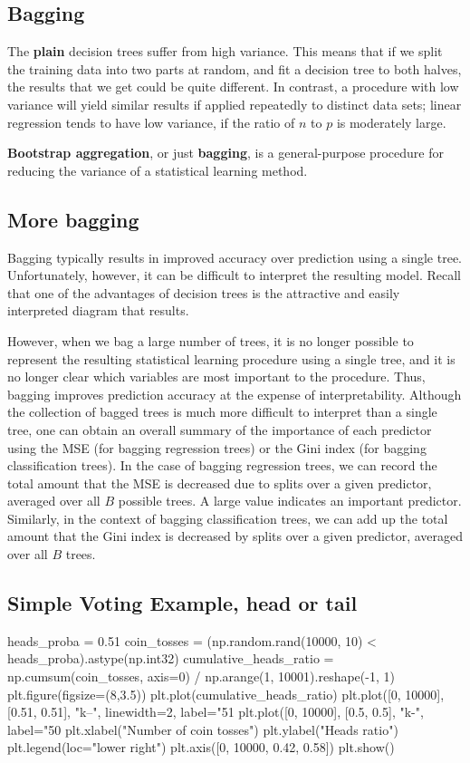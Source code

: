 \documentclass[%
oneside,                 %
final,                   %
10pt]{article}
\begin{document}
\subsection{Bagging}

The \textbf{plain} decision trees suffer from high
variance. This means that if we split the training data into two parts
at random, and fit a decision tree to both halves, the results that we
get could be quite different. In contrast, a procedure with low
variance will yield similar results if applied repeatedly to distinct
data sets; linear regression tends to have low variance, if the ratio
of $n$ to $p$ is moderately large. 

\textbf{Bootstrap aggregation}, or just \textbf{bagging}, is a
general-purpose procedure for reducing the variance of a statistical
learning method. 


\subsection{More bagging}

Bagging typically results in improved accuracy
over prediction using a single tree. Unfortunately, however, it can be
difficult to interpret the resulting model. Recall that one of the
advantages of decision trees is the attractive and easily interpreted
diagram that results.

However, when we bag a large number of trees, it is no longer
possible to represent the resulting statistical learning procedure
using a single tree, and it is no longer clear which variables are
most important to the procedure. Thus, bagging improves prediction
accuracy at the expense of interpretability.  Although the collection
of bagged trees is much more difficult to interpret than a single
tree, one can obtain an overall summary of the importance of each
predictor using the MSE (for bagging regression trees) or the Gini
index (for bagging classification trees). In the case of bagging
regression trees, we can record the total amount that the MSE is
decreased due to splits over a given predictor, averaged over all $B$ possible
trees. A large value indicates an important predictor. Similarly, in
the context of bagging classification trees, we can add up the total
amount that the Gini index  is decreased by splits over a given
predictor, averaged over all $B$ trees.

\subsection{Simple Voting Example, head or tail}
\bpycod
heads_proba = 0.51
coin_tosses = (np.random.rand(10000, 10) < heads_proba).astype(np.int32)
cumulative_heads_ratio = np.cumsum(coin_tosses, axis=0) / np.arange(1, 10001).reshape(-1, 1)
plt.figure(figsize=(8,3.5))
plt.plot(cumulative_heads_ratio)
plt.plot([0, 10000], [0.51, 0.51], "k--", linewidth=2, label="51%
plt.plot([0, 10000], [0.5, 0.5], "k-", label="50%
plt.xlabel("Number of coin tosses")
plt.ylabel("Heads ratio")
plt.legend(loc="lower right")
plt.axis([0, 10000, 0.42, 0.58])
plt.show()
\end{document}

